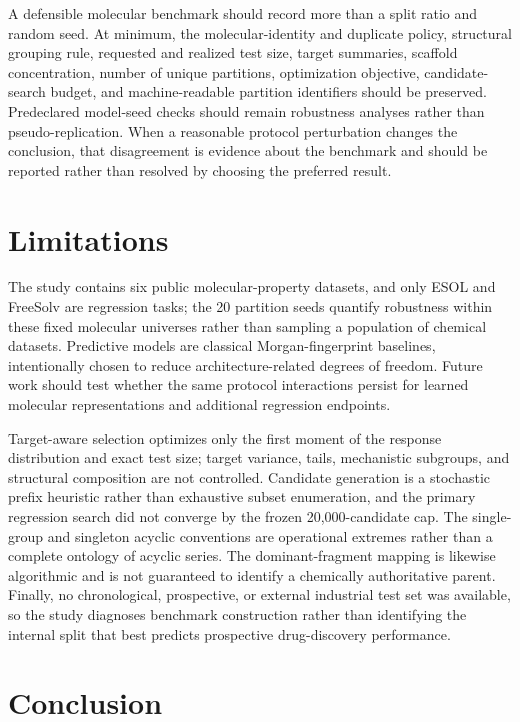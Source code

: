 A defensible molecular benchmark should record more than a split ratio and random seed. At minimum, the molecular-identity and duplicate policy, structural grouping rule, requested and realized test size, target summaries, scaffold concentration, number of unique partitions, optimization objective, candidate-search budget, and machine-readable partition identifiers should be preserved. Predeclared model-seed checks should remain robustness analyses rather than pseudo-replication. When a reasonable protocol perturbation changes the conclusion, that disagreement is evidence about the benchmark and should be reported rather than resolved by choosing the preferred result.

\section{Limitations}

The study contains six public molecular-property datasets, and only ESOL and FreeSolv are regression tasks; the 20 partition seeds quantify robustness within these fixed molecular universes rather than sampling a population of chemical datasets. Predictive models are classical Morgan-fingerprint baselines, intentionally chosen to reduce architecture-related degrees of freedom. Future work should test whether the same protocol interactions persist for learned molecular representations and additional regression endpoints.

Target-aware selection optimizes only the first moment of the response distribution and exact test size; target variance, tails, mechanistic subgroups, and structural composition are not controlled. Candidate generation is a stochastic prefix heuristic rather than exhaustive subset enumeration, and the primary regression search did not converge by the frozen 20,000-candidate cap. The single-group and singleton acyclic conventions are operational extremes rather than a complete ontology of acyclic series. The dominant-fragment mapping is likewise algorithmic and is not guaranteed to identify a chemically authoritative parent. Finally, no chronological, prospective, or external industrial test set was available, so the study diagnoses benchmark construction rather than identifying the internal split that best predicts prospective drug-discovery performance.

\section{Conclusion}

